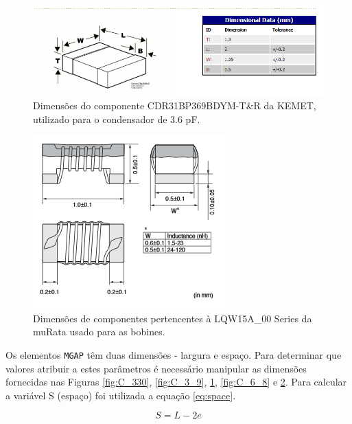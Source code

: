 \documentclass[11pt]{article}
\numberwithin{equation}{section}
\begin{document}
\begin{figure}[H]
\centering
\includegraphics[keepaspectratio=true, scale=0.45]{teoricas/3_6pF}
\vspace{-0.5em}
\caption{Dimensões do componente CDR31BP369BDYM-T\&R da KEMET, utilizado para o condensador de 3.6 pF.}
\vspace{-0.8em}
\label{fig:C_3_6}
\end{figure}

\begin{figure}[h]
\centering
\includegraphics[keepaspectratio=true, scale=0.45]{teoricas/bobines}
\vspace{-0.5em}
\caption{Dimensões de componentes pertencentes à LQW15A\_00 Series da muRata usado para as bobines.}
\vspace{-0.8em}
\label{fig:bobines}
\end{figure}


Os elementos \texttt{MGAP} têm duas dimensões - largura e espaço. Para determinar que valores atribuir a estes parâmetros é necessário manipular as dimensões fornecidas nas Figuras \ref{fig:C_330}, \ref{fig:C_3_9}, \ref{fig:C_3_6}, \ref{fig:C_6_8} e \ref{fig:bobines}. Para calcular a variável S (espaço) foi utilizada a equação \ref{eq:space}.

\vspace{-3mm}
\begin{equation}
S=L-2e
\label{eq:space}
\end{equation}
\end{document}
